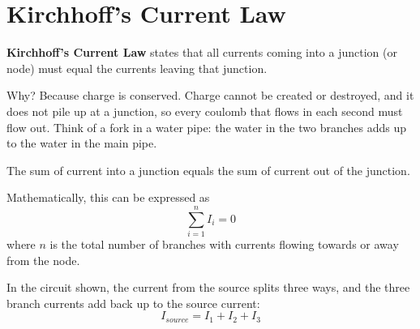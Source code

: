 \section{Kirchhoff's Current Law}
\textbf{Kirchhoff's Current Law} states that all currents coming into a junction (or node) must equal the currents leaving that junction. 

Why? Because charge is conserved. Charge cannot be created or destroyed, and it does not pile up at a junction, so every coulomb that flows in each second must flow out. Think of a fork in a water pipe: the water in the two branches adds up to the water in the main pipe. 

\begin{mdframed}[style=important, frametitle={Kirchhoff's Current Law}]
The sum of current into a junction equals the sum of current out of the junction.

Mathematically, this can be expressed as
\begin{equation}
\sum _{i=1}^{n}I_{i}=0
\end{equation}
where $n$ is the total number of branches with currents flowing towards or away from the node.


\end{mdframed}

\begin{figure}
\end{figure}
In the circuit shown, the current from the source splits three ways, and the three branch currents add back up to the source current: 
\begin{equation}
I_{source} = I_1 + I_2 + I_3  
\end{equation}


